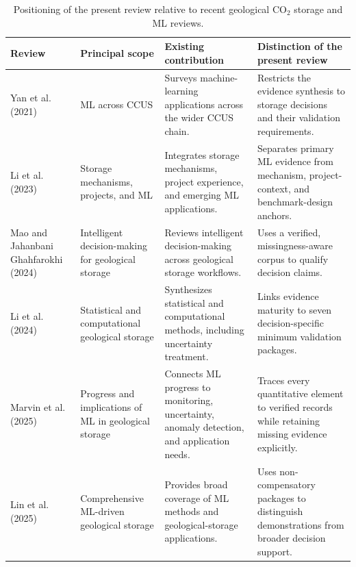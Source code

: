 \begin{table}[!htbp]
\centering
\caption{Positioning of the present review relative to recent geological CO$_2$ storage and ML reviews.}
\label{tab:positioning}
\small
\setlength{\tabcolsep}{4pt}
\begin{tabularx}{\textwidth}{>{\RaggedRight\arraybackslash}p{} >{\RaggedRight\arraybackslash}p{} >{\RaggedRight\arraybackslash}p{} >{\RaggedRight\arraybackslash}X}
\toprule
Review & Principal scope & Existing contribution & Distinction of the present review \\
\midrule
Yan et al. (2021) & ML across CCUS & Surveys machine-learning applications across the wider CCUS chain. & Restricts the evidence synthesis to storage decisions and their validation requirements. \\
Li et al. (2023) & Storage mechanisms, projects, and ML & Integrates storage mechanisms, project experience, and emerging ML applications. & Separates primary ML evidence from mechanism, project-context, and benchmark-design anchors. \\
Mao and Jahanbani Ghahfarokhi (2024) & Intelligent decision-making for geological storage & Reviews intelligent decision-making across geological storage workflows. & Uses a verified, missingness-aware corpus to qualify decision claims. \\
Li et al. (2024) & Statistical and computational geological storage & Synthesizes statistical and computational methods, including uncertainty treatment. & Links evidence maturity to seven decision-specific minimum validation packages. \\
Marvin et al. (2025) & Progress and implications of ML in geological storage & Connects ML progress to monitoring, uncertainty, anomaly detection, and application needs. & Traces every quantitative element to verified records while retaining missing evidence explicitly. \\
Lin et al. (2025) & Comprehensive ML-driven geological storage & Provides broad coverage of ML methods and geological-storage applications. & Uses non-compensatory packages to distinguish demonstrations from broader decision support. \\
\bottomrule
\end{tabularx}
\end{table}
